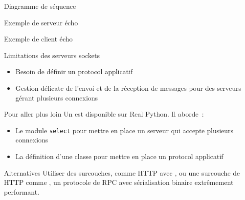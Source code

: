 \begin{frame}{Diagramme de séquence}
\end{frame}

\begin{frame}{Exemple de serveur écho}
\end{frame}

\begin{frame}{Exemple de client écho}
\end{frame}

\begin{frame}{Limitations des serveurs sockets}
  \begin{itemize}
    \item Besoin de définir un protocol applicatif
    \item Gestion délicate de l'envoi et de la réception de messages pour des serveurs gérant plusieurs connexions
  \end{itemize}
\end{frame}

\begin{frame}{Pour aller plus loin}
  Un  est disponible sur Real Python. Il aborde~:

  \begin{itemize}
    \item Le module \texttt{select} pour mettre en place un serveur qui accepte plusieurs connexions
    \item La définition d'une classe pour mettre en place un protocol applicatif
  \end{itemize}

\end{frame}

\begin{frame}{Alternatives}
  Utiliser des surcouches, comme HTTP avec , ou une surcouche de HTTP comme , un protocole de RPC avec sérialisation binaire extrêmement performant.
\end{frame}
